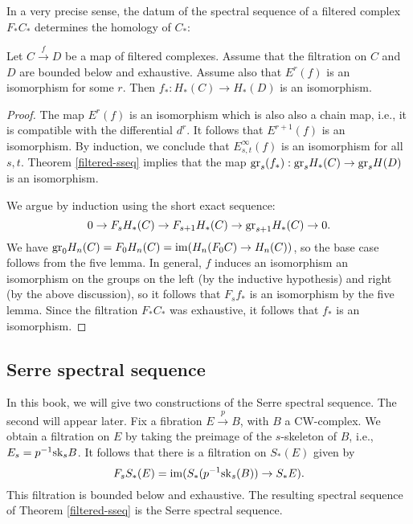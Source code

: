 %
In a very precise sense, the datum of the spectral sequence of a filtered
complex $F_\ast C_\ast$ determines the homology of $C_\ast$:
\begin{corollary}
    Let $C\xrightarrow{f} D$ be a map of filtered complexes.
    Assume that the filtration on $C$ and $D$ are bounded below and exhaustive.
    Assume also that $E^r(f)$ is an isomorphism for some $r$.
    Then $f_\ast : H_\ast(C) \to H_\ast(D)$ is an isomorphism.
\end{corollary}
\begin{proof}
    The map $E^r(f)$ is an isomorphism which is also also a chain map, i.e., it
    is compatible with the differential $d^r$. It follows that $E^{r+1}(f)$ is
    an isomorphism. By induction, we conclude that $E^\infty_{s,t}(f)$ is an
    isomorphism for all $s,t$. Theorem \ref{filtered-sseq} implies that the map
    $\mathrm{gr}_s(f_\ast):\mathrm{gr}_s H_\ast(C) \to \mathrm{gr}_s H(D)$ is an isomorphism.
    
    We argue by induction using the short exact sequence:
    $$
    0 \to F_s H_\ast(C) \to F_{s+1} H_\ast(C) \to \mathrm{gr}_{s+1} H_\ast(C) \to 0.
    $$
    We have $\mathrm{gr}_0 H_n(C) = F_0 H_n(C) = \operatorname{im}(H_n(F_0 C) \to H_n(C))$, so the
    base case follows from the five lemma. In general, $f$ induces an
    isomorphism an isomorphism on the groups on the left (by the inductive
    hypothesis) and right (by the above discussion), so it follows that $F_s
    f_\ast$ is an isomorphism by the five lemma. Since the filtration $F_\ast
    C_\ast$ was exhaustive, it follows that $f_\ast$ is an isomorphism.
\end{proof}
\subsection{Serre spectral sequence}
In this book, we will give two constructions of the Serre spectral sequence.
The second will appear later. Fix a fibration $E\xrightarrow{p} B$, with $B$ a
CW-complex. We obtain a filtration on $E$ by taking the preimage of the
$s$-skeleton of $B$, i.e., $E_s = p^{-1} \mathrm{sk}_s B$. It follows that there is a
filtration on $S_\ast(E)$ given by
$$F_s S_\ast (E) = \operatorname{im}(S_\ast(p^{-1} \mathrm{sk}_s(B)) \to S_\ast E).$$
This filtration is bounded below and exhaustive. The resulting spectral
sequence of Theorem \ref{filtered-sseq} is the Serre spectral sequence.


